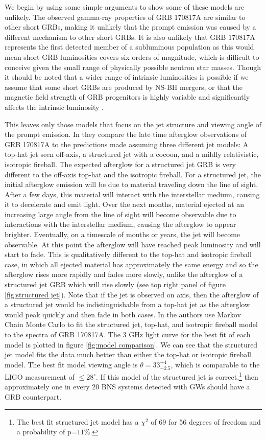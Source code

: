 \documentclass[11pt]{cuthesis}
\begin{document}
We begin by using some simple arguments to show some of these models are unlikely. The observed gamma-ray properties of GRB 170817A are similar to other short GRBs, making it unlikely that the prompt emission was caused by a different mechanism to other short GRBs. It is also unlikely that GRB 170817A represents the first detected member of a subluminous population as this would mean short GRB luminosities covers six orders of magnitude, which is difficult to conceive given the small range of physically possible neutron star masses. Though it should be noted that a wider range of intrinsic luminosities is possible if we assume that some short GRBs are produced by NS-BH mergers, or that the magnetic field strength of GRB progenitors is highly variable and significantly affects the intrinsic luminosity \cite{GW170817_GRB}.

This leaves only those models that focus on the jet structure and viewing angle of the prompt emission. In \cite{Lazzati_afterglow} they compare the late time afterglow observations of GRB 170817A to the predictions made assuming three different jet models: A top-hat jet seen off-axis, a structured jet with a cocoon, and a mildly relativistic, isotropic fireball. The expected afterglow for a structured jet GRB is very different to the off-axis top-hat and the isotropic fireball. For a structured jet, the initial afterglow emission will be due to material traveling down the line of sight. After a few days, this material will interact with the interstellar medium, causing it to decelerate and emit light. Over the next months, material ejected at an increasing large angle from the line of sight will become observable due to interactions with the interstellar medium, causing the afterglow to appear brighter. Eventually, on a timescale of months or years, the jet will become observable. At this point the afterglow will have reached peak luminosity and will start to fade. This is qualitatively different to the top-hat and isotropic fireball case, in which all ejected material has approximately the same energy and so the afterglow rises more rapidly and fades more slowly, unlike the afterglow of a structured jet GRB which will rise slowly (see top right panel of figure \ref{fig:structured jet}). Note that if the jet is observed on axis, then the afterglow of a structured jet would be indistinguishable from a top-hat jet as the afterglow would peak quickly and then fade in both cases. In \cite{Lazzati_afterglow} the authors use Markov Chain Monte Carlo to fit the structured jet, top-hat, and isotropic fireball model to the spectra of GRB 170817A. The 3 GHz light curve for the best fit of each model is plotted in figure \ref{fig:model comparison}. We can see that the structured jet model fits the data much better than either the top-hat or isotropic fireball model. The best fit model viewing angle is $\theta = 33^{+4}_{-2.5}$, which is comparable to the LIGO measurement of $\leq 28^\circ$. If this model of the structured jet is correct,\footnote{The best fit structured jet model has a $\chi^2$ of 69 for 56 degrees of freedom and a probability of p=$11\%$.} then approximately one in every 20 BNS systems detected with GWs should have a GRB counterpart.\cite{Lazzati_afterglow} 
\end{document}
